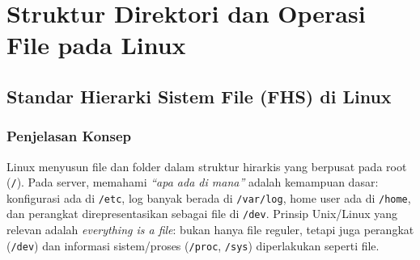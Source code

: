 
\chapter{Struktur Direktori dan Operasi File pada Linux}
\label{ch:filesystem-ops}

\begin{abstract}
Bab ini membahas struktur direktori Linux berdasarkan praktik umum \textit{Filesystem Hierarchy Standard} (FHS),
jenis-jenis file di Linux (reguler, direktori, symlink, dan file perangkat), navigasi sistem file melalui command line,
operasi file lanjutan terkait izin dan kepemilikan (\texttt{chmod}, \texttt{chown}, \texttt{chgrp}),
hard links dan symbolic links, pencarian file dengan \texttt{find} dan \texttt{locate},
serta pengarsipan dan kompresi (\texttt{tar}, \texttt{gzip}, \texttt{zip}).
Modul dirancang untuk praktikum Ubuntu Server 22.04 dengan pendekatan \textit{hands-on}: konsep, verifikasi output,
skenario mudah, dan skenario kondisi riil yang sering ditemui administrator server.
\end{abstract}

\section{Standar Hierarki Sistem File (FHS) di Linux}
\label{sec:fhs}

\subsection*{Penjelasan Konsep}
Linux menyusun file dan folder dalam struktur hirarkis yang berpusat pada root (\texttt{/}).
Pada server, memahami \textit{“apa ada di mana”} adalah kemampuan dasar: konfigurasi ada di \texttt{/etc},
log banyak berada di \texttt{/var/log}, home user ada di \texttt{/home}, dan perangkat direpresentasikan sebagai file di \texttt{/dev}.
Prinsip Unix/Linux yang relevan adalah \textit{everything is a file}: bukan hanya file reguler,
tetapi juga perangkat (\texttt{/dev}) dan informasi sistem/proses (\texttt{/proc}, \texttt{/sys}) diperlakukan seperti file.

